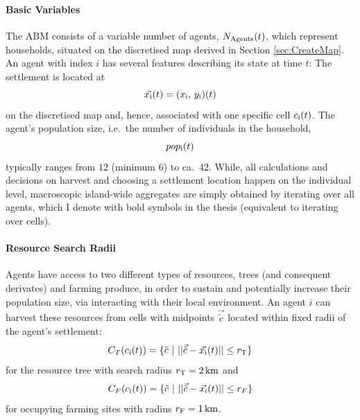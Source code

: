 \paragraph{Basic Variables}
The ABM consists of a variable number of agents, $N_{\rm Agents}(t)$, which represent households, situated on the discretised map derived in Section \ref{sec:CreateMap}.
An agent with index $i$ has several features describing its state at time $t$:
The settlement is located at 
\begin{equation}
	\vec{x_{\rm i}}(t) = (x_{\rm i},\, y_{\rm i})(t)
\end{equation}
 on the discretised map and, hence, associated with one specific cell $c_{\rm i}(t)$.
 The agent's population size, i.e.\ the number of individuals in the household, 
 \begin{equation}pop_{\rm i}(t) \end{equation}
 typically ranges from $12$ (minimum $6$) to ca.\ $42$.%
While, all calculations and decisions on harvest and choosing a settlement location happen on the individual level, macroscopic island-wide aggregates are simply obtained by iterating over all agents, which I denote with bold symbols in the thesis (equivalent to iterating over cells). 

\paragraph{Resource Search Radii}
Agents have access to two different types of resources, trees (and consequent derivates) and farming produce, in order to sustain and potentially increase their population size, via interacting with their local environment.
An agent $i$ can harvest these resources from cells with midpoints $\vec{\tilde{c}}$ located within fixed radii of the agent's settlement:
\begin{equation} \label{eq:Circle_T}
C_{T}(c_{\rm i}(t)) = \{ \tilde{c}\ | \   | |  \vec{\tilde{c}} - \vec{x_{\rm i}}(t) | |  \leq r_{\rm T} \} 
\end{equation}
for the resource tree with search radius $r_{\rm T} =2\, {\rm km}$ and 
\begin{equation} \label{eq:Circle_F}
C_{F}(c_{\rm i}(t)) = \{ \tilde{c}\ | \   | |  \vec{\tilde{c}} - \vec{x_{\rm i}}(t) | |  \leq r_{F} \}
\end{equation}
for occupying farming sites with radius $r_{\rm F} = 1\, {\rm km}$.

